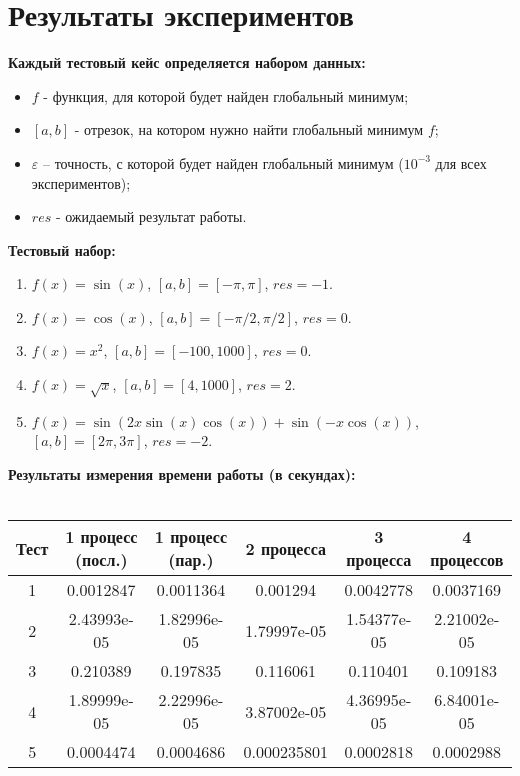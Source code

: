 \documentclass[14pt, a4paper]{extarticle}
\begin{document}
	\newpage

	\section{Результаты экспериментов}
	\noindent\textbf{Каждый тестовый кейс определяется набором данных:}
	\begin{itemize}
		\item $f$ - функция, для которой будет найден глобальный минимум;
		\item $[a,b]$ - отрезок, на котором нужно найти глобальный минимум $f$;
		\item $\varepsilon$ – точность, с которой будет найден глобальный минимум ($10^{-3}$ для всех экспериментов);
		\item $res$ - ожидаемый результат работы.
	\end{itemize}
	\noindent\textbf{Тестовый набор:}
	\begin{enumerate}
		\item $f(x) = \sin(x)$,  $[a, b] = [-\pi, \pi]$, $res = -1$.
		\item $f(x) = \cos(x)$,  $[a, b] = [-\pi/2, \pi/2]$, $res = 0$.
		\item $f(x) = x^2$,  $[a, b] = [-100, 1000]$, $res = 0$.
		\item $f(x) = \sqrt{x}$, $[a, b] = [4, 1000]$, $res = 2$.
		\item $f(x) = \sin(2x\sin(x)\cos(x)) + \sin(-x \cos(x))$,  $[a, b] = [2\pi, 3\pi]$, $res = -2$.
	\end{enumerate}

	\noindent\textbf{Результаты измерения времени работы (в секундах):}\\\\
\begin{tabular}{|c | c | c | c | c | c |} 
	\hline
	Тест & 1 процесс (посл.) & 1 процесс (пар.) & 2 процесса & 3 процесса & 4 процессов \\
	\hline
	1 & 0.0012847 & 0.0011364  & 0.001294 & 0.0042778 & 0.0037169 \\ 
	\hline
	2 & 2.43993e-05 & 1.82996e-05 & 1.79997e-05 & 1.54377e-05 & 2.21002e-05 \\
	\hline
	3 & 0.210389  & 0.197835 & 0.116061 & 0.110401  & 0.109183 \\
	\hline
	4 & 1.89999e-05  & 2.22996e-05 & 3.87002e-05 & 4.36995e-05  & 6.84001e-05 \\
	\hline
	5 & 0.0004474  & 0.0004686 & 0.000235801 & 0.0002818  & 0.0002988 \\
	\hline
\end{tabular}
\end{document}

